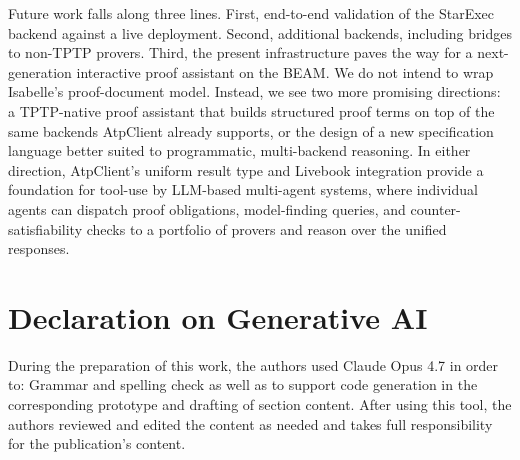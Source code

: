 \documentclass[]{ceurart}
\begin{document}
Future work falls along three lines. First, end-to-end validation of the StarExec backend against a live deployment. Second, additional backends, including bridges to non-TPTP provers. Third, the present infrastructure paves the way for a next-generation interactive proof assistant on the BEAM. We do not intend to wrap Isabelle's proof-document model. Instead, we see two more promising directions: a TPTP-native proof assistant that builds structured proof terms on top of the same backends AtpClient already supports, or the design of a new specification language better suited to programmatic, multi-backend reasoning. In either direction, AtpClient's uniform result type and Livebook integration provide a foundation for tool-use by LLM-based multi-agent systems, where individual agents can dispatch proof obligations, model-finding queries, and counter-satisfiability checks to a portfolio of provers and reason over the unified responses.


\section*{Declaration on Generative AI}

During the preparation of this work, the authors used Claude Opus 4.7 in order to: Grammar and spelling check as well as to support code generation in the corresponding prototype and drafting of section content. After using this tool, the authors reviewed and edited the content as needed and takes full responsibility for the publication’s content.


\end{document}
